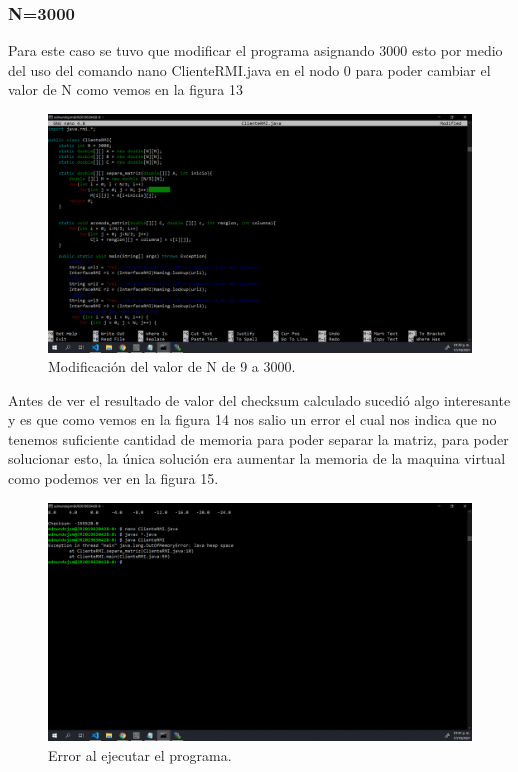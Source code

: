 \documentclass[11pt]{article}
\begin{document}
		\subsubsection{N=3000}
		Para este caso se tuvo que modificar el programa asignando 3000 esto por medio del uso del comando nano ClienteRMI.java en el nodo 0 para poder cambiar el valor de N como vemos en la figura 13
		\begin{figure}[H]
			\centering
			\includegraphics[scale=0.34]{resources/config3000.png}
			\caption{Modificación del valor de N de 9 a 3000. }\label{fig:picture}
		\end{figure}
		Antes de ver el resultado de valor del checksum calculado sucedió algo interesante y es que como vemos en la figura 14 nos salio un error el cual nos indica que no tenemos suficiente cantidad de memoria para poder separar la matriz, para poder solucionar esto, la única solución era aumentar la memoria de la maquina virtual como podemos ver en la figura 15.
		\begin{figure}[H]
			\centering
			\includegraphics[scale=0.34]{resources/error.png}
			\caption{Error al ejecutar el programa.}\label{fig:picture}
		\end{figure}
\end{document}
